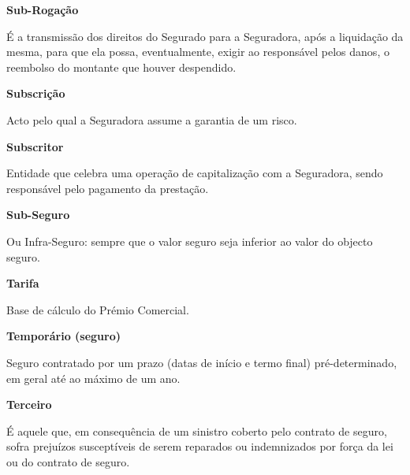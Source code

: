 \begin{description}
\item \textbf{Sub-Rogação}

É a transmissão dos direitos do Segurado para a Seguradora, após a liquidação da mesma, para que ela possa, eventualmente, exigir ao responsável pelos danos, o reembolso do montante que houver despendido.
\end{description}

\begin{description}
\item \textbf{Subscrição}

Acto pelo qual a Seguradora assume a garantia de um risco.
\end{description}

\begin{description}
\item \textbf{Subscritor}

Entidade que celebra uma operação de capitalização com a Seguradora, sendo responsável pelo pagamento da prestação.
\end{description}

\begin{description}
\item \textbf{Sub-Seguro}

Ou Infra-Seguro: sempre que o valor seguro seja inferior ao valor do objecto seguro.
\end{description}

\begin{description}
\item \textbf{Tarifa}

Base de cálculo do Prémio Comercial.
\end{description}

\begin{description}
\item \textbf{Temporário (seguro)}

Seguro contratado por um prazo (datas de início e termo final) pré-determinado, em geral até ao máximo de um ano.
\end{description}

\begin{description}
\item \textbf{Terceiro}

É aquele que, em consequência de um sinistro coberto pelo contrato de seguro, sofra prejuízos susceptíveis de serem reparados ou indemnizados por força da lei ou do contrato de seguro.
\end{description}

